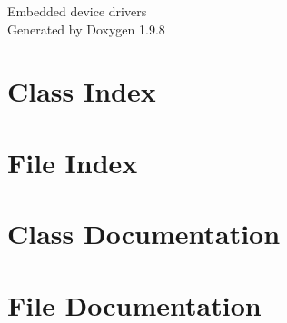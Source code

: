 \documentclass[twoside]{book}
\newcommand{\+}{\discretionary{\mbox{\scriptsize$\hookleftarrow$}}{}{}}
\newcommand{\clearemptydoublepage}{%
    \newpage{\pagestyle{empty}\cleardoublepage}%
  }
\begin{document}
  \raggedbottom
    \hypersetup{pageanchor=false,
                bookmarksnumbered=true,
                pdfencoding=unicode
               }
  \begin{titlepage}
  \vspace*{7cm}
  \begin{center}%
  {\Large Embedded device drivers}\\
  \vspace*{1cm}
  {\large Generated by Doxygen 1.9.8}\\
  \end{center}
  \end{titlepage}
  \clearemptydoublepage
  \tableofcontents
  \clearemptydoublepage
  \hypersetup{pageanchor=true}
\chapter{Class Index}

\chapter{File Index}

\chapter{Class Documentation}


\chapter{File Documentation}









  \backmatter
  \newpage
  \clearemptydoublepage
  \printindex
\end{document}
